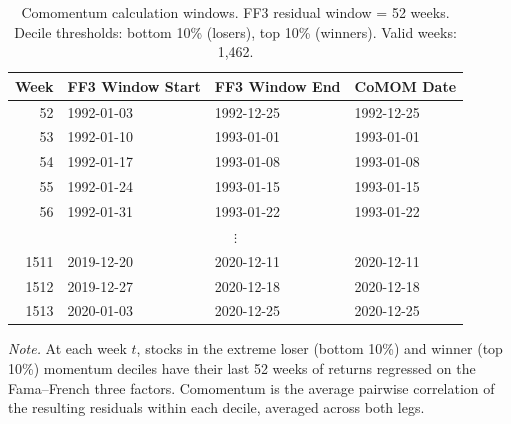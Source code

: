 \begin{table}[htbp]
\centering
\caption{Comomentum calculation windows. FF3 residual window = 52 weeks. Decile thresholds: bottom 10\% (losers), top 10\% (winners). Valid weeks: 1,462.}
\label{tab:comom_calc}
\small
\begin{tabular}{r l l l}
\toprule
    Week & FF3 Window Start & FF3 Window End & CoMOM Date \\
\midrule
    52 & 1992-01-03 & 1992-12-25 & 1992-12-25 \\
    53 & 1992-01-10 & 1993-01-01 & 1993-01-01 \\
    54 & 1992-01-17 & 1993-01-08 & 1993-01-08 \\
    55 & 1992-01-24 & 1993-01-15 & 1993-01-15 \\
    56 & 1992-01-31 & 1993-01-22 & 1993-01-22 \\
    \multicolumn{4}{c}{$\vdots$} \\
    1511 & 2019-12-20 & 2020-12-11 & 2020-12-11 \\
    1512 & 2019-12-27 & 2020-12-18 & 2020-12-18 \\
    1513 & 2020-01-03 & 2020-12-25 & 2020-12-25 \\
\bottomrule
\end{tabular}
\vspace{4pt}
\begin{flushleft}
\footnotesize
\textit{Note.} At each week $t$, stocks in the extreme loser (bottom 10\%) and winner (top 10\%) momentum deciles have their last 52 weeks of returns regressed on the Fama--French three factors. Comomentum is the average pairwise correlation of the resulting residuals within each decile, averaged across both legs.
\end{flushleft}
\end{table}
